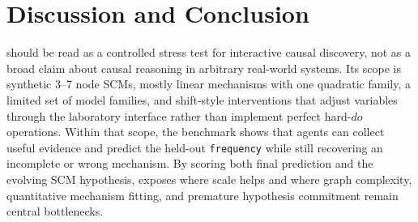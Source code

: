 \section{Discussion and Conclusion}
\projectname{} should be read as a controlled stress test for interactive causal discovery, not as a broad claim about causal reasoning in arbitrary real-world systems. Its scope is synthetic 3--7 node SCMs, mostly linear mechanisms with one quadratic family, a limited set of model families, and shift-style interventions that adjust variables through the laboratory interface rather than implement perfect hard-\(do\) operations. Within that scope, the benchmark shows that agents can collect useful evidence and predict the held-out \texttt{frequency} while still recovering an incomplete or wrong mechanism. By scoring both final prediction and the evolving SCM hypothesis, \projectname{} exposes where scale helps and where graph complexity, quantitative mechanism fitting, and premature hypothesis commitment remain central bottlenecks.

